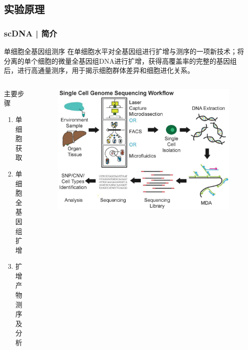 \documentclass[11pt]{ctexbeamer}
\begin{document}
\subsection{实验原理}
\begin{frame}
  \frametitle{scDNA | 简介}
  \begin{block}{单细胞全基因组测序}
在单细胞水平对全基因组进行扩增与测序的一项新技术；将分离的单个细胞的微量全基因组DNA进行扩增，获得高覆盖率的完整的基因组后，进行高通量测序，用于揭示细胞群体差异和细胞进化关系。
  \end{block}
  \vspace{-0.5em}
  \pause
  \begin{columns}
    \begin{block}{主要步骤}
      \begin{enumerate}
        \item 单细胞获取
        \item 单细胞全基因组扩增
        \item 扩增产物测序及分析
      \end{enumerate}
    \end{block}
  \begin{figure}
    \centering
    \includegraphics[width=\textwidth]{scDNA_workflow.png}
  \end{figure}
  \end{columns}
\end{frame}
\end{document}
